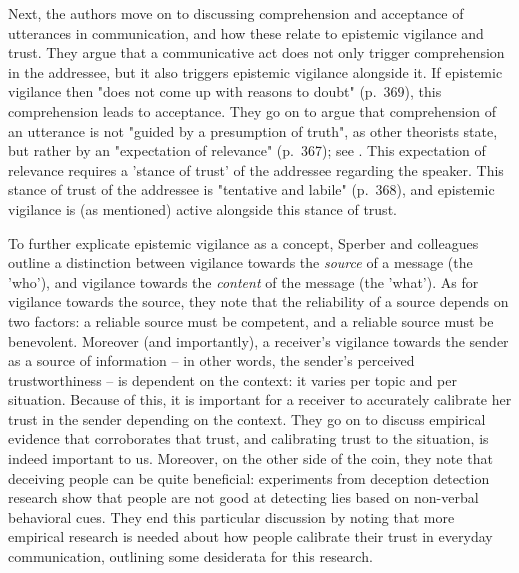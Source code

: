 Next, the authors move on to discussing comprehension and acceptance of utterances in communication, and how these relate to epistemic vigilance and trust.
They argue that a communicative act does not only trigger comprehension in the addressee, but it also triggers epistemic vigilance alongside it. If epistemic vigilance then "does not come up with reasons to doubt" (p.~369), this comprehension leads to acceptance.
They go on to argue that comprehension of an utterance is not "guided by a presumption of truth", as other theorists state, but rather by an "expectation of relevance" (p.~367); see \citet{SperberWilson86}. This expectation of relevance requires a 'stance of trust' of the addressee regarding the speaker.
This stance of trust of the addressee is "tentative and labile" (p.~368), and epistemic vigilance is (as mentioned) active alongside this stance of trust.


To further explicate epistemic vigilance as a concept, Sperber and colleagues outline a distinction between vigilance towards the \emph{source} of a message (the 'who'), and vigilance towards the \emph{content} of the message (the 'what').
As for vigilance towards the source, they note that the reliability of a source depends on two factors: a reliable source must be competent, and a reliable source must be benevolent.
Moreover (and importantly), a receiver's vigilance towards the sender as a source of information -- in other words, the sender's perceived trustworthiness -- is dependent on the context: it varies per topic and per situation.
Because of this, it is important for a receiver to accurately calibrate her trust in the sender depending on the context.
They go on to discuss empirical evidence that corroborates that trust, and calibrating trust to the situation, is indeed important to us.
Moreover, on the other side of the coin, they note that deceiving people can be quite beneficial: experiments from deception detection research show that people are not good at detecting lies based on non-verbal behavioral cues.
They end this particular discussion by noting that more empirical research is needed about how people calibrate their trust in everyday communication, outlining some desiderata for this research.


